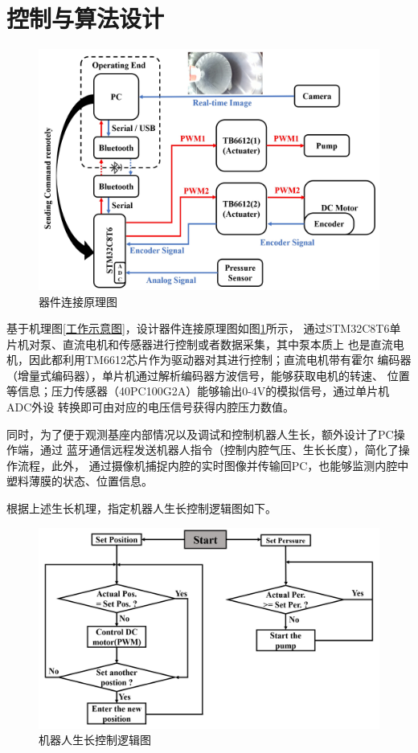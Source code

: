 \documentclass[11pt, a4paper, oneside]{ctexart}
\begin{document}
\section{控制与算法设计}
\begin{figure}[H]
    \includegraphics[scale=0.2]{器件连接原理图}
    \caption{器件连接原理图}
    \label{器件连接原理图}
\end{figure}

基于机理图\ref{工作示意图}，设计器件连接原理图如图\ref{器件连接原理图}所示，
通过STM32C8T6单片机对泵、直流电机和传感器进行控制或者数据采集，其中泵本质上
也是直流电机，因此都利用TM6612芯片作为驱动器对其进行控制；直流电机带有霍尔
编码器（增量式编码器），单片机通过解析编码器方波信号，能够获取电机的转速、
位置等信息；压力传感器（40PC100G2A）能够输出0-4V的模拟信号，通过单片机ADC外设
转换即可由对应的电压信号获得内腔压力数值。

同时，为了便于观测基座内部情况以及调试和控制机器人生长，额外设计了PC操作端，通过
蓝牙通信远程发送机器人指令（控制内腔气压、生长长度），简化了操作流程，此外，
通过摄像机捕捉内腔的实时图像并传输回PC，也能够监测内腔中塑料薄膜的状态、位置信息。

根据上述生长机理，指定机器人生长控制逻辑图如下。
\begin{figure}[H]
    \centering
    \includegraphics[scale=0.2]{控制框图}
    \caption{机器人生长控制逻辑图}
    \label{控制逻辑图}
\end{figure}
\end{document}
